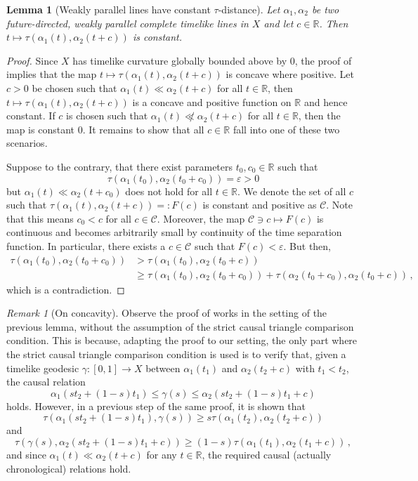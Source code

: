 \documentclass[11pt,reqno]{amsart}
\theoremstyle{definition}
\theoremstyle{definition}
\theoremstyle{plain}
\newtheorem{lem}[dfn]{Lemma}
\theoremstyle{remark}
\newtheorem{rem}[dfn]{Remark}
\newcommand{\R}{\mathbb R}
\begin{document}
\begin{lem}[Weakly parallel lines have constant $\tau$-distance]
\label{lem:constancy of time separation}
Let $\alpha_1, \alpha_2$ be two future-directed, weakly parallel complete timelike lines in $X$ and let $c\in \mathbb{R}$. Then $t\mapsto\tau(\alpha_1(t),\alpha_2(t+c))$ is constant.
\end{lem}
\begin{proof}
Since $X$ has timelike curvature globally bounded above by $0$, the proof of \cite[Proposition 6.1]{beran-kunzinger-rott2024} implies that the map $t\mapsto \tau(\alpha_1(t),\alpha_2(t+c))$ is concave where positive. Let $c>0$ be chosen such that $\alpha_1(t)\ll\alpha_2(t+c)$ for all $t\in\mathbb R$, then $t\mapsto \tau(\alpha_1(t),\alpha_2(t+c))$ is a concave and positive function on $\R$ and hence constant. If $c$ is chosen such that $\alpha_1(t)\not\ll \alpha_2(t+c)$ for all $t\in\R$, then the map is constant $0$. It remains to show that all $c\in\R$ fall into one of these two scenarios. 

Suppose to the contrary, that there exist parameters $t_0,c_0\in\mathbb R$ such that 
\[\tau(\alpha_1(t_0),\alpha_2(t_0+c_0))=\varepsilon>0\]
but $\alpha_1(t)\ll \alpha_2(t+c_0)$ does not hold for all $t\in\mathbb R$. We denote the set of all $c$ such that $\tau(\alpha_1(t),\alpha_2(t+c))=:F(c)$ is constant and positive as $\mathcal C$. Note that this means $c_0<c$ for all $c\in\mathcal C$. Moreover, the map $\mathcal{C}\ni c\mapsto F(c)$ is continuous and becomes arbitrarily small by continuity of the time separation function. In particular, there exists a $c\in\mathcal C$ such that $F(c)<\varepsilon$. But then, 
\begin{align*}
    \tau(\alpha_1(t_0),\alpha_2(t_0+c_0))&>\tau(\alpha_1(t_0),\alpha_2(t_0+c))\\
    &\geq\tau(\alpha_1(t_0),\alpha_2(t_0+c_0))+\tau(\alpha_2(t_0+c_0),\alpha_2(t_0+c)) \, ,
\end{align*}
which is a contradiction.
\end{proof}

\begin{rem}[On concavity]
Observe the proof of \cite[Proposition 6.1]{beran-kunzinger-rott2024} works in the setting of the previous lemma, without the assumption of the strict causal triangle comparison condition. This is because, adapting the proof to our setting, the only part where the strict causal triangle comparison condition is used is to verify that, given a timelike geodesic $\gamma\colon [0,1]\to X$ between $\alpha_1(t_1)$ and $\alpha_2(t_2+c)$ with $t_1<t_2$, the causal relation 
\[
\alpha_1(st_2+(1-s)t_1)\le \gamma(s)\le \alpha_2(st_2+(1-s)t_1+c)
\]
holds.
However, in a previous step of the same proof, it is shown that 
\[
\tau(\alpha_1(st_2+(1-s)t_1),\gamma(s))\geq s\tau(\alpha_1(t_2),\alpha_2(t_2+c))
\]
and 
\[
\tau(\gamma(s),\alpha_2(st_2+(1-s)t_1+c))\geq (1-s)\tau(\alpha_1(t_1),\alpha_2(t_1+c)) \, ,
\]
and since $\alpha_1(t)\ll \alpha_2(t+c)$ for any $t\in \mathbb{R}$, the required causal (actually chronological) relations hold.
\end{rem}
\end{document}
